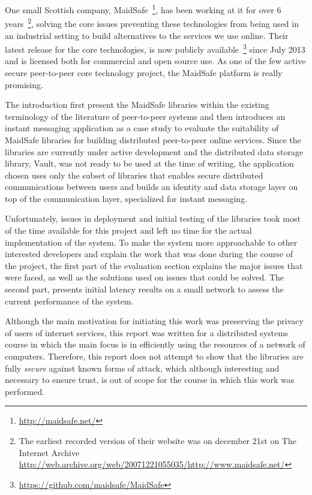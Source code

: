 One small Scottish company, MaidSafe~\footnote{\url{http://maidsafe.net/}}, has been working at it for over 6 years~\footnote{The earliest recorded version of their website was on december 21st on The Internet Archive \url{http://web.archive.org/web/20071221055035/http://www.maidsafe.net/}}, solving the core issues preventing these technologies from being used in an industrial setting to build alternatives to the services we use online. Their latest release for the core technologies, is now publicly available~\footnote{\url{https://github.com/maidsafe/MaidSafe}} since July 2013 and is licensed both for commercial and open source use. As one of the few active secure peer-to-peer core technology project, the MaidSafe platform is really promising.

The introduction first present the MaidSafe libraries within the existing terminology of the literature of peer-to-peer systems and then introduces an instant messaging application as a case study to evaluate the suitability of MaidSafe libraries for building distributed peer-to-peer online services. Since the libraries are currently under active development and the distributed data storage library, Vault, was not ready to be used at the time of writing, the application chosen uses only the subset of libraries that enables secure distributed communications between users and builds an identity and data storage layer on top of the communication layer, specialized for instant messaging.

Unfortunately, issues in deployment and initial testing of the libraries took most of the time available for this project and left no time for the actual implementation of the system. To make the system more approachable to other interested developers and explain the work that was done during the course of the project, the first part of the evaluation section explains the major issues that were faced, as well as the solutions used on issues that could be solved. The second part, presents initial latency results on a small network to assess the current performance of the system.

Although the main motivation for initiating this work was preserving the privacy of users of internet services, this report was written for a distributed systems course in which the main focus is in efficiently using the resources of a network of computers.  Therefore, this report does not attempt to show that the libraries are fully \textit{secure} against known forms of attack, which although interesting and necessary to ensure trust, is out of scope for the course in which this work was performed.

